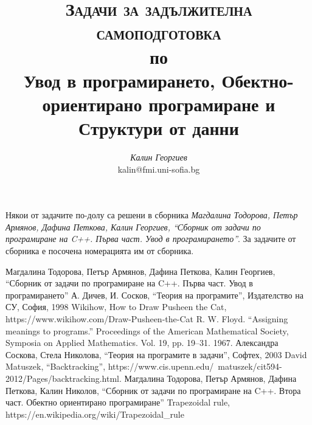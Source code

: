 \documentclass[12pt,a4paper]{article}
\author{\textit{Калин Георгиев}\\
\small{kalin@fmi.uni-sofia.bg}}
\title{\textsc{Задачи за задължителна самоподготовка} \\
по \\
Увод в програмирането, Обектно-ориентирано програмиране и Структури от данни}
\begin{document}
\maketitle

\tableofcontents

\pagebreak

\small{Някои от задачите по-долу са решени в сборника \cite{sbornik}\textit{Магдалина Тодорова, Петър Армянов, Дафина Петкова, Калин Георгиев, ``Сборник от задачи по програмиране на C++. Първа част. Увод в програмирането''}. За задачите от сборника е посочена номерацията им от сборника.}

\pagebreak



\pagebreak 



\pagebreak 



\pagebreak


\begin{thebibliography}{99}

	Магдалина Тодорова, Петър Армянов, Дафина Петкова, Калин Георгиев, ``Сборник от задачи по програмиране на C++. Първа част. Увод в програмирането''
 А. Дичев, И. Сосков, ``Теория на програмите'', Издателство на СУ, София, 1998
 Wikihow, How to Draw Pusheen the Cat, https://www.wikihow.com/Draw-Pusheen-the-Cat
 R. W. Floyd. ``Assigning meanings to programs.'' Proceedings of the American Mathematical Society, Symposia on Applied Mathematics. Vol. 19, pp. 19–31. 1967.
	Александра Соскова, Стела Николова, ``Теория на програмите в задачи'', Софтех, 2003
	David Matuszek, ``Backtracking'', https://www.cis.upenn.edu/~matuszek/cit594-2012/Pages/backtracking.html.
 Магдалина Тодорова, Петър Армянов, Дафина Петкова, Калин Николов, ``Сборник от задачи по програмиране на C++. Втора част. Обектно ориентирано програмиране''
 Trapezoidal rule, https://en.wikipedia.org/wiki/Trapezoidal\_rule


\end{thebibliography}
\end{document}
